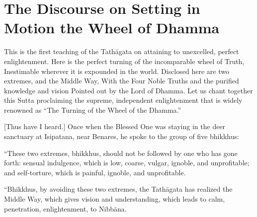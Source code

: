 \chapter[The Wheel of Dhamma]{The Discourse on Setting in Motion the Wheel of Dhamma}

\begin{leader}

This is the first teaching of the Tathāgata on attaining to unexcelled, perfect enlightenment.
Here is the perfect turning of the incomparable wheel of Truth,
Inestimable wherever it is expounded in the world.
Disclosed here are two extremes, and the Middle Way,
With the Four Noble Truths and the purified knowledge and vision
Pointed out by the Lord of Dhamma.
Let us chant together this Sutta proclaiming the supreme, independent enlightenment that is widely renowned as
``The Turning of the Wheel of the Dhamma.''
\end{leader}

[Thus have I heard.] Once when the Blessed One was staying in the deer sanctuary at Isipatana, near Benares, he spoke to the group of five bhikkhus:

``These two extremes, bhikkhus, should not be followed by one who has gone forth: sensual indulgence, which is low, coarse, vulgar, ignoble, and unprofitable; and self-torture, which is painful, ignoble, and unprofitable.

``Bhikkhus, by avoiding these two extremes, the Tathāgata has realized the Middle Way, which gives vision and understanding, which leads to calm, penetration, enlightenment, to Nibbāna.


